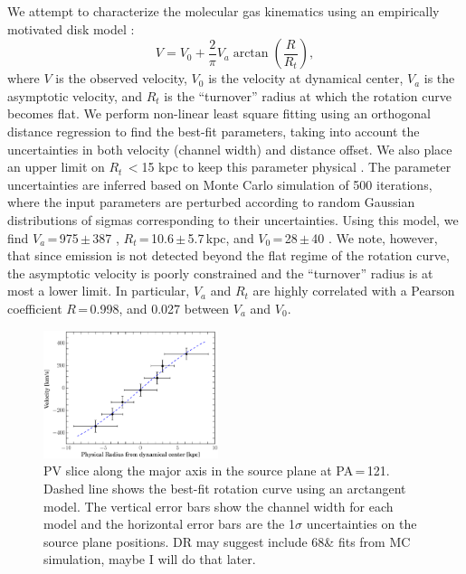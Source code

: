 \documentclass[]{emulateapj}
\begin{document}
We attempt to characterize the molecular gas kinematics using an empirically motivated disk model \citep[\eg][]{Courteau97a,Puech08a,Miller11a}:
\begin{equation}
V = V_0 + \frac{2}{\pi} V_{a} \arctan(\frac{R}{R_{t}}),
\end{equation}
where $V$ is the observed velocity, $V_0$ is the velocity at dynamical center,
$V_{a}$ is the asymptotic velocity, and $R_{t}$ is the ``turnover''
radius at which the rotation curve becomes flat.
We perform non-linear least square fitting using an orthogonal distance
regression to find the best-fit parameters,
taking into account the uncertainties in both velocity (channel width) and
distance offset. We also place an upper limit on $R_{t}$\,$<$15 kpc
to keep this parameter physical \citep[\eg][]{Puech08a,Miller11a}.
The parameter uncertainties are inferred based on Monte Carlo simulation
of 500 iterations, where the input parameters are perturbed
according to random Gaussian distributions of sigmas
corresponding to their uncertainties.
Using this model, we find $V_{a}$\,=\,975\,$\pm$\,387 \kms,
$R_{t}$\,=\,10.6\,$\pm$\,5.7\,kpc, and $V_0$\,=\,28\,$\pm$\,40 \kms.
We note, however, that since emission is not detected beyond the flat regime
of the rotation curve, the asymptotic velocity is poorly constrained and
the ``turnover'' radius is at most a lower limit.
In particular, $V_{a}$ and $R_{t}$ are highly correlated with a
Pearson coefficient $R$\,=\,0.998, and 0.027 between $V_{a}$ and $V_0$.

\begin{figure}[!htbp]
\centering
\includegraphics[width=0.455\textwidth]{../Figures/bestfit_PV.eps}
\caption{PV slice along the major axis in the source plane at PA\,=\,121\degr.
Dashed line shows the best-fit rotation curve using an arctangent model.
The vertical error bars show the channel width for
each model and the horizontal error bars are the
1$\sigma$ uncertainties on the source plane positions.
DR may suggest include 68\& fits from MC simulation, maybe I will do that later.
 \label{fig:PV}}
\end{figure}
\end{document}
